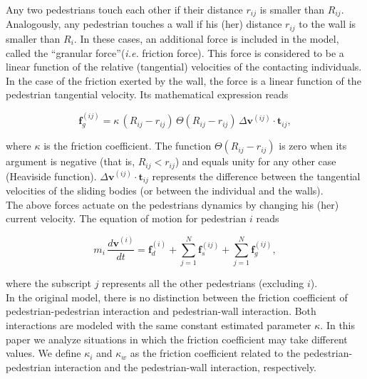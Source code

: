 \documentclass[preprint,12pt]{elsarticle}
\begin{document}
Any two pedestrians touch each other if their distance $r_{ij}$ is smaller than 
$R_{ij}$. Analogously, any pedestrian touches a wall if his (her) distance $r_{ij}$ to the wall is smaller than $R_i$. In these cases, an additional force is included in the model, called the ``granular force''(\textit{i.e.} friction force). This force is considered to be a linear function of the relative (tangential) velocities of the contacting individuals. In the case of the friction exerted by the wall, the force is a linear function of the pedestrian tangential velocity. 
Its mathematical expression reads

\begin{equation}
        \mathbf{f}_g^{(ij)} = 
\kappa\,(R_{ij}-r_{ij})\,\Theta(R_{ij}-r_{ij})\,\Delta
\mathbf{v}^{(ij)}\cdot\mathbf{t}_{ij}, 
        \label{granular}
\end{equation}

where $\kappa$ is the friction coefficient. The function 
$\Theta(R_{ij}-r_{ij})$ is zero when its argument is negative (that is, 
$R_{ij}<r_{ij}$) and equals unity for any other case (Heaviside function). 
$\Delta\mathbf{v}^{(ij)}\cdot\mathbf{t}_{ij}$ represents the difference between 
the tangential velocities of the sliding bodies (or between the individual and 
the walls).\\

The above forces actuate on the pedestrians dynamics by changing his (her) 
current velocity. The equation of motion for pedestrian $i$ reads

\begin{equation}
m_i\,\displaystyle\frac{d\mathbf{v}^{(i)}}{dt}=\mathbf{f}_d^{(i)}
+\displaystyle\sum_{j=1}^{N}\displaystyle\mathbf{f}_s^{(ij)}
+\displaystyle\sum_ {
j=1}^{N}\mathbf{f}_g^{(ij)},\label{eq_mov}
\end{equation}

where the subscript $j$ represents all the other pedestrians 
(excluding $i$).\\

In the original model, there is no distinction between the friction coefficient of pedestrian-pedestrian interaction and pedestrian-wall interaction. Both interactions are modeled with the same constant estimated parameter $\kappa$. In this paper we analyze situations in which the friction coefficient may take different values. We define $\kappa_i$ and $\kappa_w$ as the friction coefficient related to the pedestrian-pedestrian interaction and the pedestrian-wall interaction, respectively. 
\end{document}
